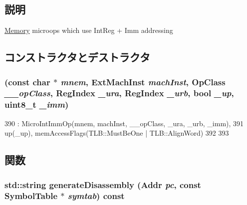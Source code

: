 \subsection{説明}
\hyperlink{classArmISA_1_1Memory}{Memory} microops which use IntReg + Imm addressing 

\subsection{コンストラクタとデストラクタ}
\hypertarget{classArmISA_1_1MicroMemOp_aa3d3e0b762997684acc50593592bb84b}{
\subsubsection[{MicroMemOp}]{ (const char $\ast$ {\em mnem}, \/  {\bf ExtMachInst} {\em machInst}, \/  OpClass {\em \_\-\_\-opClass}, \/  {\bf RegIndex} {\em \_\-ura}, \/  {\bf RegIndex} {\em \_\-urb}, \/  bool {\em \_\-up}, \/  uint8\_\-t {\em \_\-imm})}}
\label{classArmISA_1_1MicroMemOp_aa3d3e0b762997684acc50593592bb84b}



\begin{DoxyCode}
390             : MicroIntImmOp(mnem, machInst, __opClass, _ura, _urb, _imm),
391               up(_up), memAccessFlags(TLB::MustBeOne | TLB::AlignWord)
392     {
393     }
\end{DoxyCode}


\subsection{関数}
\hypertarget{classArmISA_1_1MicroMemOp_a95d323a22a5f07e14d6b4c9385a91896}{
\subsubsection[{generateDisassembly}]{\setlength{\rightskip}{0pt plus 5cm}std::string generateDisassembly ({\bf Addr} {\em pc}, \/  const SymbolTable $\ast$ {\em symtab}) const}}
\label{classArmISA_1_1MicroMemOp_a95d323a22a5f07e14d6b4c9385a91896}


